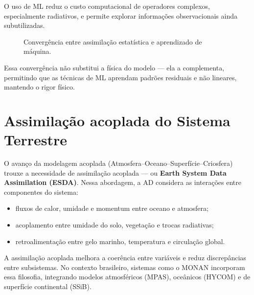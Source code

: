 O uso de ML reduz o custo computacional de operadores complexos, especialmente radiativos, e permite explorar informações observacionais ainda subutilizadas.

\begin{figure}[h!]
\centering
{}
\caption{Convergência entre assimilação estatística e aprendizado de máquina.}
\label{fig:hibrido-ml}
\end{figure}

Essa convergência não substitui a física do modelo — ela a complementa, permitindo que as técnicas de ML aprendam padrões residuais e não lineares, mantendo o rigor físico.

\section{Assimilação acoplada do Sistema Terrestre}
O avanço da modelagem acoplada (Atmosfera–Oceano–Superfície–Criosfera) trouxe a necessidade de assimilação acoplada — ou \textbf{Earth System Data Assimilation (ESDA)}.
Nessa abordagem, a AD considera as interações entre componentes do sistema:
\begin{itemize}
  \item fluxos de calor, umidade e momentum entre oceano e atmosfera;
  \item acoplamento entre umidade do solo, vegetação e trocas radiativas;
  \item retroalimentação entre gelo marinho, temperatura e circulação global.
\end{itemize}

A assimilação acoplada melhora a coerência entre variáveis e reduz discrepâncias entre subsistemas.
No contexto brasileiro, sistemas como o MONAN incorporam essa filosofia, integrando modelos atmosféricos (MPAS), oceânicos (HYCOM) e de superfície continental (SSiB).

